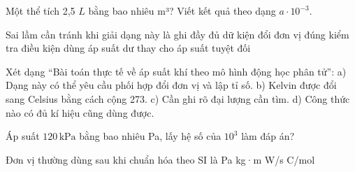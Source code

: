 \begin{ex}
Một thể tích 2,5 $L$ bằng bao nhiêu m³? Viết kết quả theo dạng $a\cdot10^{-3}$.
\end{ex}

\begin{ex}
Sai lầm cần tránh khi giải dạng này là
\choice
{ghi đầy đủ dữ kiện}
{đổi đơn vị đúng}
{kiểm tra điều kiện}
{\True dùng áp suất dư thay cho áp suất tuyệt đối}
\end{ex}

\begin{ex}
Xét dạng “Bài toán thực tế về áp suất khí theo mô hình động học phân tử”: a) Dạng này có thể yêu cầu phối hợp đổi đơn vị và lập tỉ số. b) Kelvin được đổi sang Celsius bằng cách cộng 273. c) Cần ghi rõ đại lượng cần tìm. d) Công thức nào có đủ kí hiệu cũng dùng được.
\choiceTF

\end{ex}

\begin{ex}
Áp suất $120\,\text{kPa}$ bằng bao nhiêu Pa, lấy hệ số của $10^3$ làm đáp án?
\end{ex}

\begin{ex}
Đơn vị thường dùng sau khi chuẩn hóa theo SI là
\choice
{\True Pa}
{kg·m}
{W/s}
{C/mol}
\end{ex}


